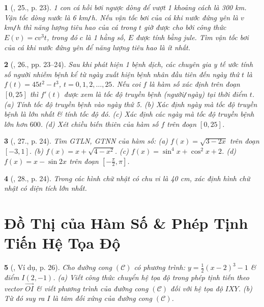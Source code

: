 \documentclass{article}
\newtheorem{baitoan}{}
\begin{document}
\begin{baitoan}[\cite{SGK_Toan_12_giai_tich_nang_cao}, 25., p. 23]
	1 con cá hồi bơi ngược dòng để vượt 1 khoảng cách là {\rm300 km}. Vận tốc dòng nước là {\rm6 km{\tt/}h}. Nếu vận tốc bơi của cá khi nước đứng yên là $v$ {\rm km{\tt/}h} thì năng lượng tiêu hao của cá trong $t$ giờ được cho bởi công thức $E(v) = cv^3t$, trong đó $c$ là 1 hằng số, $E$ được tính bằng jule. Tìm vận tốc bơi của cá khi nước đứng yên để năng lượng tiêu hao là ít nhất.
\end{baitoan}

\begin{baitoan}[\cite{SGK_Toan_12_giai_tich_nang_cao}, 26., pp. 23--24]
	Sau khi phát hiện 1 bệnh dịch, các chuyên gia y tế ước tính số người nhiễm bệnh kể từ ngày xuất hiện bệnh nhân đầu tiên đến ngày thứ $t$ là $f(t) = 45t^2 - t^3$, $t = 0,1,2,\ldots,25$. Nếu coi $f$ là hàm số xác định trên đoạn $[0,25]$ thì $f'(t)$ được xem là tốc độ truyền bệnh (người{\tt/}ngày) tại thời điểm $t$. (a) Tính tốc độ truyền bệnh vào ngày thứ 5. (b) Xác định ngày mà tốc độ truyền bệnh là lớn nhất \& tính tốc độ đó. (c) Xác định các ngày mà tốc độ truyền bệnh lớn hơn $600$. (d) Xét chiều biến thiên của hàm số $f$ trên đoạn $[0,25]$.
\end{baitoan}

\begin{baitoan}[\cite{SGK_Toan_12_giai_tich_nang_cao}, 27., p. 24]
	Tìm {\rm GTLN, GTNN} của hàm số: (a) $f(x) = \sqrt{3 - 2x}$ trên đoạn $[-3,1]$. (b) $f(x) = x + \sqrt{4 - x^2}$. (c) $f(x) = \sin^4x + \cos^2x + 2$. (d) $f(x) = x - \sin2x$ trên đoạn $\left[-\frac{\pi}{2},\pi\right]$.
\end{baitoan}

\begin{baitoan}[\cite{SGK_Toan_12_giai_tich_nang_cao}, 28., p. 24]
	Trong các hình chữ nhật có chu vi là {\rm40 cm}, xác định hình chữ nhật có diện tích lớn nhất.
\end{baitoan}


\section{Đồ Thị của Hàm Số \& Phép Tịnh Tiến Hệ Tọa Độ}

\begin{baitoan}[\cite{SGK_Toan_12_giai_tich_nang_cao}, Ví dụ, p. 26]
	Cho đường cong $(\mathcal{C})$ có phương trình: $y = \frac{1}{2}(x - 2)^3 - 1$ \& điểm $I(2,-1)$. (a) Viết công thức chuyển hệ tọa độ trong phép tịnh tiến theo vector $\vec{OI}$ \& viết phương trình của đường cong $(\mathcal{C})$ đối với hệ tọa độ $IXY$. (b) Từ đó suy ra $I$ là tâm đối xứng của đường cong $(\mathcal{C})$.
\end{baitoan}
\end{document}
